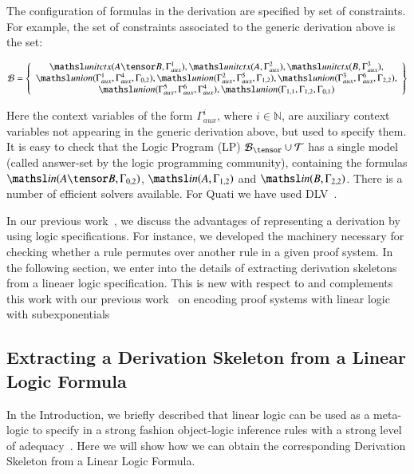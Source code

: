 \documentclass[a4paper,10pt]{article}
\newcommand{\elin}[2]{\ensuremath{{\tsl{unitctx}(\ensuremath{#1}, \ensuremath{#2})}}}
\newcommand{\union}[3]{\ensuremath{{\tsl{union}(\ensuremath{#1},\ensuremath{#2},\ensuremath{ #3})}}}
\newcommand{\In}[2]{\ensuremath{\tsl{in}(\ensuremath{#1},\ensuremath{#2})}}
\begin{document}
The configuration of formulas in the derivation are specified by set of constraints.
For example, the set of constraints associated to the generic derivation above is the 
set:
\begin{small}
\[
\Bscr = \left\{
\begin{array}{c}
\elin{A \tensor B}{\Gamma_{aux}^1},
\elin{A}{\Gamma_{aux}^2},
\elin{B}{\Gamma_{aux}^3}, \\
\union{\Gamma_{aux}^1}{\Gamma_{aux}^4}{\Gamma_{0,2}},
\union{\Gamma_{aux}^2}{\Gamma_{aux}^5}{\Gamma_{1,2}}, 
\union{\Gamma_{aux}^3}{\Gamma_{aux}^6}{\Gamma_{2,2}},\\
\union{\Gamma_{aux}^5}{\Gamma_{aux}^6}{\Gamma_{aux}^4},
\union{\Gamma_{1,1}}{\Gamma_{1,2}}{\Gamma_{0,1}}
\end{array}
\right\}
\]
\end{small}%
Here the context variables of the form $\Gamma_{aux}^i$, where $i \in \mathbb{N}$, are 
auxiliary context variables not appearing in the generic derivation above, 
but used to specify them. It is easy to check that the Logic Program (LP) $\Bscr_\tensor \cup \Tscr$
has a single model (called answer-set by the logic programming community), 
containing the formulas $\In{A \tensor B}{\Gamma_{0,2}}$,
$\In{A}{\Gamma_{1,2}}$ and $\In{B}{\Gamma_{2,2}}$. There is a number of efficient 
solvers available. For Quati we have used DLV~\cite{dlv}.

In our previous work~\cite{nigam13iclp}, we discuss the advantages of representing 
a derivation by using logic specifications. For instance, we developed the machinery 
necessary for checking whether a rule permutes over another rule in a given proof system.
In the following section, we enter into the details of extracting derivation skeletons
from a lineaer logic specification. This is new with respect to \cite{nigam13iclp} and 
complements this work with our previous work~\cite{nigam.jlc} on encoding proof systems with linear logic with 
subexponentials 

\subsection{Extracting a Derivation Skeleton from a Linear Logic Formula}
\label{sec:extract}

In the Introduction, we briefly described that linear logic can be used as a meta-logic 
to specify in a strong fashion object-logic inference rules with a strong level of 
adequacy~\cite{nigam10jar}. Here we will show how we can obtain the corresponding
Derivation Skeleton from a Linear Logic Formula. 
\end{document}
